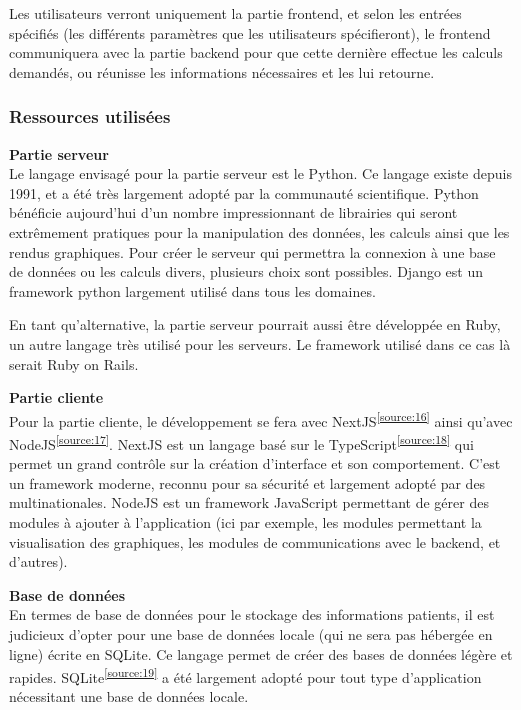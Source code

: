 Les utilisateurs verront uniquement la partie frontend, et selon les entrées spécifiés (les différents paramètres que les utilisateurs spécifieront), le frontend communiquera avec la partie backend pour que cette dernière effectue les calculs demandés, ou réunisse les informations nécessaires et les lui retourne.

\subsubsection{Ressources utilisées}

\textbf{Partie serveur} \\
Le langage envisagé pour la partie serveur est le Python.
Ce langage existe depuis 1991, et a été très largement adopté par la communauté scientifique.
Python bénéficie aujourd'hui d'un nombre impressionnant de librairies qui seront extrêmement pratiques pour la manipulation des données, les calculs ainsi que les rendus graphiques.
Pour créer le serveur qui permettra la connexion à une base de données ou les calculs divers, plusieurs choix sont possibles.
Django est un framework python largement utilisé dans tous les domaines.

En tant qu'alternative, la partie serveur pourrait aussi être développée en Ruby, un autre langage très utilisé pour les serveurs.
Le framework utilisé dans ce cas là serait Ruby on Rails.

\textbf{Partie cliente} \\
Pour la partie cliente, le développement se fera avec NextJS\textsuperscript{\ref{source:16}} ainsi qu'avec NodeJS\textsuperscript{\ref{source:17}}.
NextJS est un langage basé sur le TypeScript\textsuperscript{\ref{source:18}} qui permet un grand contrôle sur la création d'interface et son comportement.
C'est un framework moderne, reconnu pour sa sécurité et largement adopté par des multinationales.
NodeJS est un framework JavaScript permettant de gérer des modules à ajouter à l'application (ici par exemple, les modules permettant la visualisation des graphiques, les modules de communications avec le backend, et d'autres).

\textbf{Base de données} \\
En termes de base de données pour le stockage des informations patients, il est judicieux d’opter pour une base de données locale (qui ne sera pas hébergée en ligne) écrite en SQLite.
Ce langage permet de créer des bases de données légère et rapides.
SQLite\textsuperscript{\ref{source:19}} a été largement adopté pour tout type d’application nécessitant une base de données locale.

